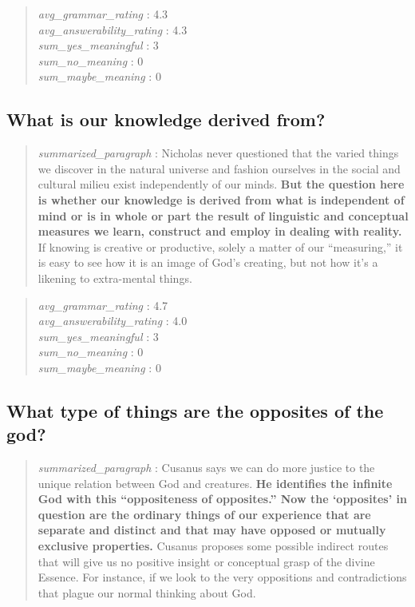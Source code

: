 \begin{quote}
\emph{avg\_grammar\_rating} : 4.3\\
\emph{avg\_answerability\_rating} : 4.3\\
\emph{sum\_yes\_meaningful} : 3\\
\emph{sum\_no\_meaning} : 0\\
\emph{sum\_maybe\_meaning} : 0
\end{quote}

\hypertarget{what-is-our-knowledge-derived-from}{%
\subsection{What is our knowledge derived
from?}\label{what-is-our-knowledge-derived-from}}

\begin{quote}
\emph{summarized\_paragraph} : Nicholas never questioned that the varied
things we discover in the natural universe and fashion ourselves in the
social and cultural milieu exist independently of our minds. \textbf{But
the question here is whether our knowledge is derived from what is
independent of mind or is in whole or part the result of linguistic and
conceptual measures we learn, construct and employ in dealing with
reality.} If knowing is creative or productive, solely a matter of our
``measuring,'' it is easy to see how it is an image of God's creating,
but not how it's a likening to extra-mental things.
\end{quote}

\begin{quote}
\emph{avg\_grammar\_rating} : 4.7\\
\emph{avg\_answerability\_rating} : 4.0\\
\emph{sum\_yes\_meaningful} : 3\\
\emph{sum\_no\_meaning} : 0\\
\emph{sum\_maybe\_meaning} : 0
\end{quote}

\hypertarget{what-type-of-things-are-the-opposites-of-the-god}{%
\subsection{What type of things are the opposites of the
god?}\label{what-type-of-things-are-the-opposites-of-the-god}}

\begin{quote}
\emph{summarized\_paragraph} : Cusanus says we can do more justice to
the unique relation between God and creatures. \textbf{He identifies the
infinite God with this ``oppositeness of opposites.'' Now the
`opposites' in question are the ordinary things of our experience that
are separate and distinct and that may have opposed or mutually
exclusive properties.} Cusanus proposes some possible indirect routes
that will give us no positive insight or conceptual grasp of the divine
Essence. For instance, if we look to the very oppositions and
contradictions that plague our normal thinking about God.
\end{quote}


